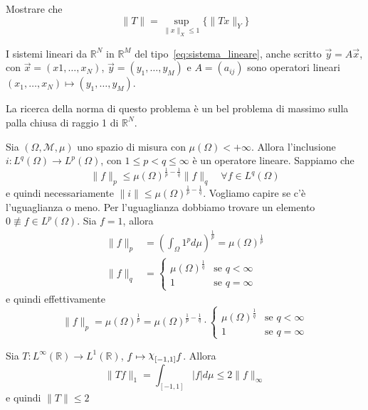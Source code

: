 \begin{eser}
    Mostrare che
    \[
        \|T\| = \sup_{\|x\|_X \le 1}  \{\|Tx\|_Y \} 
    \]
\end{eser}
\begin{example}
    I sistemi lineari da \(\mathbb{R}^{N}\) in \(\mathbb{R}^{M}\) del
    tipo~\eqref{eq:sistema_lineare}, 
    anche scritto \(\vec{y} = A \vec{x}\), con \(\vec{x} = {(x1, \dots, x_N)}\),
    \(\vec{y} = {(y_{1}, \dots, y_M)}\) e \(A = {(a_{ij})}\) 
    sono operatori lineari \({(x_{1}, \dots, x_N) \mapsto {(y_{1}, \dots,
    y_M)}}\).

    La ricerca della norma di questo problema è un bel problema di massimo sulla
    palla chiusa di raggio 1 di \(\mathbb{R}^{N}\).
\end{example}
\begin{example}
    Sia \({(\Omega, \mathcal{M}, \mu)}\) uno spazio di misura con
    \(\mu{(\Omega)} < +\infty\). Allora l'inclusione \(i : L^{q}{(\Omega)} \to
    L^{p}{(\Omega)}\), con \(1 \le p < q \le \infty\) è un operatore lineare.
    Sappiamo che
    \[
        \|f\|_p \le {\mu{(\Omega)}}^{\frac{1}{p} - \frac{1}{q}}\|f\|_q \quad \forall
        f \in L^{q}{(\Omega)}
    \]
    e quindi necessariamente \(\|i\| \le \mu{(\Omega)}^{\frac{1}{p} -
    \frac{1}{q}}\). Vogliamo capire se c'è l'uguaglianza o meno. Per
    l'uguaglianza dobbiamo trovare un elemento \(0 \not\equiv f \in L^{p}{(\Omega)}\).
    Sia \(f = 1\), allora
    \begin{align*}
        \|f\|_p &= {\left( \int_\Omega 1^{p}d\mu \right)} ^{\frac{1}{p}} =
        \mu{(\Omega)}^{\frac{1}{p}} \\
        \|f\|_q &= \begin{cases}
            \mu{(\Omega)}^{\frac{1}{q}} & \text{se } q <
            \infty \\
            1 & \text{se } q = \infty
        \end{cases}
    \end{align*}
    e quindi effettivamente
    \[
        \|f\|_p = \mu{(\Omega)}^{\frac{1}{p}} = \mu{(\Omega)}^{\frac{1}{p} -
        \frac{1}{q}} \cdot \begin{cases}
                \mu{(\Omega)}^{\frac{1}{q}} & \text{se } q < \infty \\
                1 & \text{se } q = \infty
            \end{cases}
    \]
\end{example}
\begin{example}\label{ex:int_continuo}
    Sia \(T : L^{\infty}{(\mathbb{R})} \to L^{1}{(\mathbb{R})}\), \(f \mapsto
    \rchi_{[-1, 1]}f \). Allora
    \[
        \|Tf\|_1 = \int_{[-1, 1]}  |f| d\mu \le 2 \|f\|_{\infty} 
    \]
    e quindi \(\|T\| \le 2\) 
\end{example}
